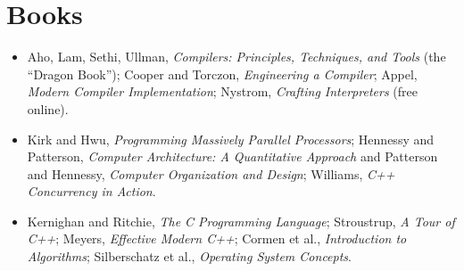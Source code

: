 \documentclass[10pt,a4paper,openany,oneside]{report}
\begin{document}
\section{Books}
\begin{itemize}[nosep]
\item Aho, Lam, Sethi, Ullman, \emph{Compilers: Principles, Techniques, and Tools} (the ``Dragon Book''); Cooper and Torczon, \emph{Engineering a Compiler}; Appel, \emph{Modern Compiler Implementation}; Nystrom, \emph{Crafting Interpreters} (free online).
\item Kirk and Hwu, \emph{Programming Massively Parallel Processors}; Hennessy and Patterson, \emph{Computer Architecture: A Quantitative Approach} and Patterson and Hennessy, \emph{Computer Organization and Design}; Williams, \emph{C++ Concurrency in Action}.
\item Kernighan and Ritchie, \emph{The C Programming Language}; Stroustrup, \emph{A Tour of C++}; Meyers, \emph{Effective Modern C++}; Cormen et al., \emph{Introduction to Algorithms}; Silberschatz et al., \emph{Operating System Concepts}.
\end{itemize}
\end{document}
